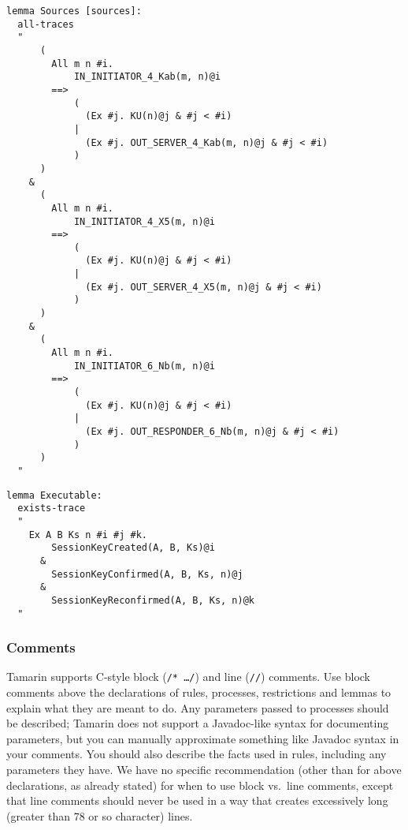 \begin{itemize}
\begin{center}
\begin{minipage}{0.9\linewidth}
\begin{lstlisting}
lemma Sources [sources]:
  all-traces
  "
      (
        All m n #i.
            IN_INITIATOR_4_Kab(m, n)@i
        ==>
            (
              (Ex #j. KU(n)@j & #j < #i)
            |
              (Ex #j. OUT_SERVER_4_Kab(m, n)@j & #j < #i)
            )
      )
    &
      (
        All m n #i.
            IN_INITIATOR_4_X5(m, n)@i
        ==>
            (
              (Ex #j. KU(n)@j & #j < #i)
            |
              (Ex #j. OUT_SERVER_4_X5(m, n)@j & #j < #i)
            )
      )
    &
      (
        All m n #i.
            IN_INITIATOR_6_Nb(m, n)@i
        ==>
            (
              (Ex #j. KU(n)@j & #j < #i)
            |
              (Ex #j. OUT_RESPONDER_6_Nb(m, n)@j & #j < #i)
            )
      )
  "
\end{lstlisting}
\end{minipage}
\end{center}

\begin{center}
\begin{minipage}{0.7\linewidth}
\begin{lstlisting}
lemma Executable:
  exists-trace
  "
    Ex A B Ks n #i #j #k.
        SessionKeyCreated(A, B, Ks)@i
      &
        SessionKeyConfirmed(A, B, Ks, n)@j
      &
        SessionKeyReconfirmed(A, B, Ks, n)@k
  "
\end{lstlisting}
\end{minipage}
\end{center}

\end{itemize}

\subsubsection{Comments}

Tamarin supports C-style block (\texttt{/* \ldots */}) and line (\texttt{//}) comments. Use block comments above the declarations of rules, processes, restrictions and lemmas to explain what they are meant to do. Any parameters passed to processes should be described; Tamarin does not support a Javadoc-like syntax for documenting parameters, but you can manually approximate something like Javadoc syntax in your comments. You should also describe the facts used in rules, including any parameters they have. We have no specific recommendation (other than for above declarations, as already stated) for when to use block vs.~line comments, except that line comments should never be used in a way that creates excessively long (greater than 78 or so character) lines.

